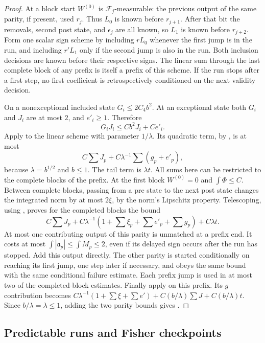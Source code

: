 \begin{proof}
At a block start $W^{(0)}$ is $\mathcal F_j$-measurable: the previous
output of the same parity, if present, used $r_j$.  Thus $L_0$ is known
before $r_{j+1}$.  After that bit the removals, second post state, and
$\epsilon_j$ are all known, so $L_1$ is known before $r_{j+2}$.  Form one
scalar sign scheme by including $rL_0$ whenever the first jump is in the
run, and including $r'L_1$ only if the second jump is also in the run.
Both inclusion decisions are known before their respective signs.  The
linear sum through the last complete block of any prefix is itself a
prefix of this scheme.  If the run stops after a first step, no first
coefficient is retrospectively conditioned on the next validity decision.

On a nonexceptional included state $G_i\le2C_4b^2$.  At an exceptional
state both $G_i$ and $J_i$ are at most $2$, and $e'_i\ge1$.  Therefore
\[
 G_iJ_i\le Cb^2J_i+Ce'_i.
\]
Apply  to the linear scheme with parameter
$1/\lambda$.  Its quadratic term, by
, is at most
\[
 C\sum J_p+C\lambda^{-1}\sum(g_p+e'_p),
\]
because $\lambda=b^{1/2}$ and $b\le1$.  The tail term is $\lambda t$.
All sums here can be restricted to the complete blocks of the prefix.
At the first block $W^{(0)}=0$ and $\int\Phi\le C$.  Between complete
blocks, passing from a pre state to the next post state changes the
integrated norm by at most $2\xi$, by the norm's Lipschitz property.
Telescoping, using , proves for the completed
blocks the bound
\[
 C\sum J_p+C\lambda^{-1}\left(1+\sum\xi_p+\sum e'_p+\sum g_p\right)
                              +C\lambda t.
\]
At most one contributing output of this parity is unmatched at a prefix
end.  It costs at most $\int|\mathfrak a_p|\le\int M_p\le2$, even if its delayed
sign occurs after the run has stopped.  Add this output directly.
The other parity is started conditionally on reaching its first jump,
one step later if necessary, and obeys the same bound with the same
conditional failure estimate.  Each prefix jump is used in at most two
of the completed-block estimates.  Finally apply
 on this prefix.  Its $g$ contribution becomes
$C\lambda^{-1}(1+\sum\xi+\sum e')+C(b/\lambda)\sum J+C(b/\lambda)t$.
Since $b/\lambda=\lambda\le1$, adding the two parity bounds gives
.
\end{proof}

\subsection{Predictable runs and Fisher checkpoints}

